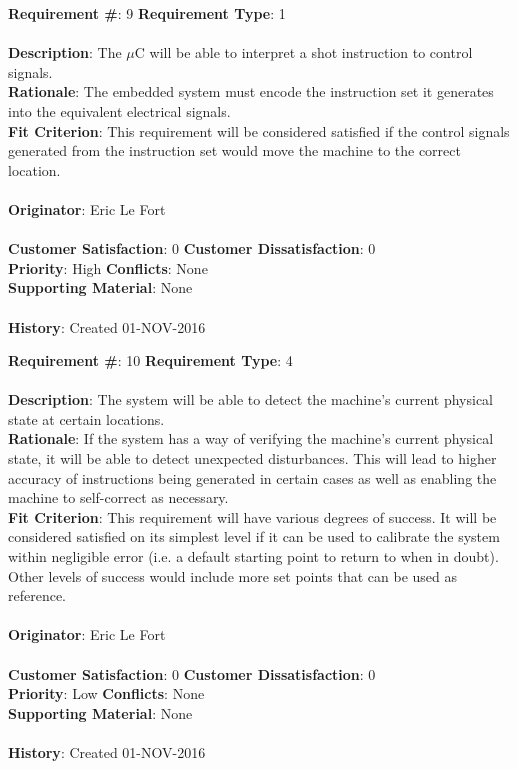 \documentclass[titlepage]{article}
\begin{document}
\begin{framed}
	\noindent\textbf{Requirement \#}: 9 \hfill \textbf{Requirement Type}: 1 \hfill\\\\
	\noindent\textbf{Description}: The $\mu$C will be able to interpret a shot instruction to control signals.\\
	\textbf{Rationale}: The embedded system must encode the instruction set it generates into the equivalent electrical signals.\\
	\textbf{Fit Criterion}: This requirement will be considered satisfied if the control signals generated from the instruction set would move the machine to the correct location.\\\\
	\textbf{Originator}: Eric Le Fort\\\\
	\noindent\textbf{Customer Satisfaction}: 0 \hfill 	\textbf{Customer Dissatisfaction}: 0 \hfill\\
	\textbf{Priority}: High \hfill \textbf{Conflicts}: None \hfill\\
	\textbf{Supporting Material}: None\\\\
	\noindent\textbf{History}: Created 01-NOV-2016
\end{framed}

\newpage
\begin{framed}
	\noindent\textbf{Requirement \#}: 10 \hfill \textbf{Requirement Type}: 4 \hfill\\\\
	\noindent\textbf{Description}: The system will be able to detect the machine's current physical state at certain locations.\\
	\textbf{Rationale}: If the system has a way of verifying the machine's current physical state, it will be able to detect unexpected disturbances. This will lead to higher accuracy of instructions being generated in certain cases as well as enabling the machine to self-correct as necessary.\\
	\textbf{Fit Criterion}: This requirement will have various degrees of success. It will be considered satisfied on its simplest level if it can be used to calibrate the system within negligible error (i.e. a default starting point to return to when in doubt). Other levels of success would include more set points that can be used as reference.\\\\
	\textbf{Originator}: Eric Le Fort\\\\
	\noindent\textbf{Customer Satisfaction}: 0 \hfill 	\textbf{Customer Dissatisfaction}: 0 \hfill\\
	\textbf{Priority}: Low \hfill \textbf{Conflicts}: None \hfill\\
	\textbf{Supporting Material}: None\\\\
	\noindent\textbf{History}: Created 01-NOV-2016
\end{framed}
\end{document}
